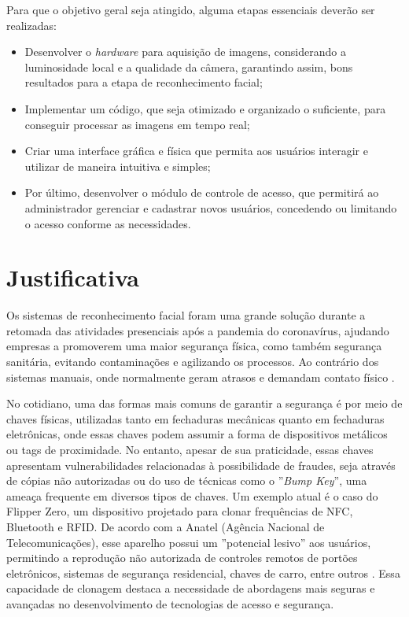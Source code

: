 Para que o objetivo geral seja atingido, alguma etapas essenciais deverão 
ser realizadas:

\begin{itemize}
    \item  Desenvolver o \textit{hardware} para aquisição de imagens, considerando a 
    luminosidade local e a qualidade da câmera, garantindo assim, 
    bons resultados para a etapa de reconhecimento facial;
  
    \item Implementar um código, que seja otimizado e organizado o suficiente, 
    para conseguir processar as imagens em tempo real; 
    
    \item Criar uma interface gráfica e física que permita aos usuários interagir 
    e utilizar de maneira intuitiva e simples;
    
    \item Por último, desenvolver o módulo de controle de acesso, que permitirá 
    ao administrador gerenciar e cadastrar novos usuários, concedendo ou 
    limitando o acesso conforme as necessidades.
\end{itemize}

\section{Justificativa}\label{sec:justificativa}

Os sistemas de reconhecimento facial foram uma grande solução durante a retomada 
das atividades presenciais após a pandemia do coronavírus, ajudando empresas
a promoverem uma maior segurança física, como também segurança sanitária, 
evitando contaminações e agilizando os processos. Ao contrário dos sistemas 
manuais, onde normalmente geram atrasos e demandam contato físico \cite{terra2020}.

No cotidiano, uma das formas mais comuns de garantir a segurança é por meio de 
chaves físicas, utilizadas tanto em fechaduras mecânicas quanto em fechaduras 
eletrônicas, onde essas chaves podem assumir a forma de dispositivos metálicos 
ou tags de proximidade. No entanto, apesar de sua praticidade, 
essas chaves apresentam vulnerabilidades relacionadas à possibilidade de 
fraudes, seja através de cópias não autorizadas ou do uso de técnicas como 
o ''\textit{Bump Key}'', uma ameaça frequente em diversos tipos de chaves. Um exemplo 
atual é o caso do Flipper Zero, um dispositivo projetado para clonar 
frequências de NFC, Bluetooth e RFID. De acordo com a Anatel (Agência 
Nacional de Telecomunicações), esse aparelho possui um ''potencial lesivo'' 
aos usuários, permitindo a reprodução não autorizada de controles 
remotos de portões eletrônicos, sistemas de segurança residencial, 
chaves de carro, entre outros \cite{anatel2023}. Essa capacidade de clonagem destaca 
a necessidade de abordagens mais seguras e avançadas no desenvolvimento 
de tecnologias de acesso e segurança. 

